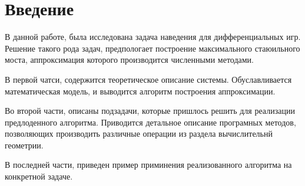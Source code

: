 \section{Введение}
 
В данной работе,
была исследована задача наведения для дифференциальных игр.
Решение такого рода задач,
предпологает построение максимального стаюильного моста,
аппроксимация которого производится численными методами.

В первой чатси, содержится теоретическое описание системы.
Обуславливается математическая модель, и выводится алгоритм 
построения аппроксимации.

Во второй части, описаны подзадачи,
которые пришлось решить для реализации предлоденного алгоритма.
Приводится детальное описание програмных методов,
позволяющих производить различные операции из раздела
вычислительнй геометрии.

В последней части, 
приведен пример приминения реализованного алгоритма
на конкретной задаче.